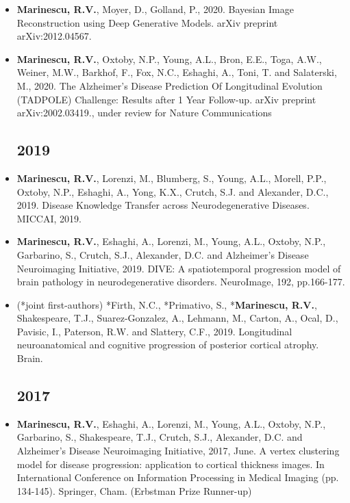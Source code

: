 \documentclass[a4paper,10pt]{article} %
\begin{document}
\newcommand{\poster}{\textcolor{red}{Poster}}
\newcommand{\talk}{\textcolor{green!60!black}{Talk}}
\newcommand{\journal}{\textcolor{blue}{Journal}}


\begin{itemize}
\subsection*{2020}
\item[\talk] \textbf{Marinescu, R.V.}, Moyer, D., Golland, P., 2020. Bayesian Image Reconstruction using Deep Generative Models. arXiv preprint arXiv:2012.04567.
\item[\journal] \textbf{Marinescu, R.V.}, Oxtoby, N.P., Young, A.L., Bron, E.E., Toga, A.W., Weiner, M.W., Barkhof, F., Fox, N.C., Eshaghi, A., Toni, T. and Salaterski, M., 2020. The Alzheimer's Disease Prediction Of Longitudinal Evolution (TADPOLE) Challenge: Results after 1 Year Follow-up. arXiv preprint arXiv:2002.03419., under review for Nature Communications

\subsection*{2019}
\item[\poster] \textbf{Marinescu, R.V.}, Lorenzi, M., Blumberg, S., Young, A.L., Morell, P.P., Oxtoby, N.P., Eshaghi, A., Yong, K.X., Crutch, S.J. and Alexander, D.C., 2019. Disease Knowledge Transfer across Neurodegenerative Diseases. MICCAI, 2019.

\item[\journal] \textbf{Marinescu, R.V.}, Eshaghi, A., Lorenzi, M., Young, A.L., Oxtoby, N.P., Garbarino, S., Crutch, S.J., Alexander, D.C. and Alzheimer's Disease Neuroimaging Initiative, 2019. DIVE: A spatiotemporal progression model of brain pathology in neurodegenerative disorders. NeuroImage, 192, pp.166-177.

\item[\journal] (*joint first-authors) *Firth, N.C., *Primativo, S., *\textbf{Marinescu, R.V.}, Shakespeare, T.J., Suarez-Gonzalez, A., Lehmann, M., Carton, A., Ocal, D., Pavisic, I., Paterson, R.W. and Slattery, C.F., 2019. Longitudinal neuroanatomical and cognitive progression of posterior cortical atrophy. Brain.

\subsection*{2017}
\item[\talk] \textbf{Marinescu, R.V.}, Eshaghi, A., Lorenzi, M., Young, A.L., Oxtoby, N.P., Garbarino, S., Shakespeare, T.J., Crutch, S.J., Alexander, D.C. and Alzheimer’s Disease Neuroimaging Initiative, 2017, June. A vertex clustering model for disease progression: application to cortical thickness images. In International Conference on Information Processing in Medical Imaging (pp. 134-145). Springer, Cham. (Erbstman Prize Runner-up)



\end{itemize}
\end{document}
